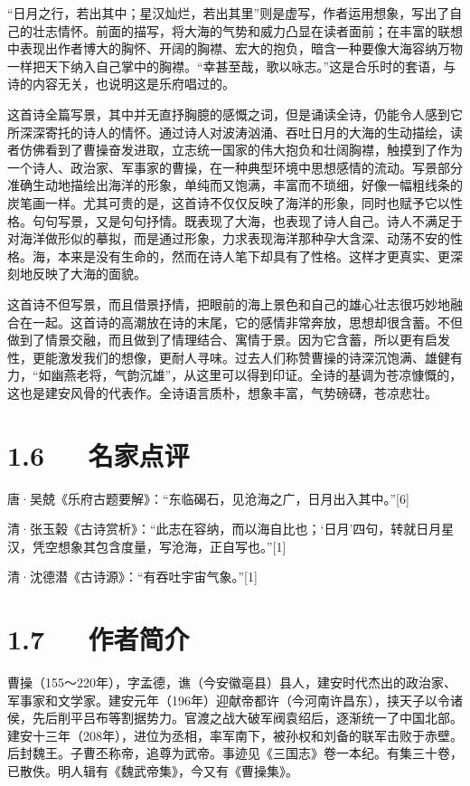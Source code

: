\documentclass[letterpaper,12pt,english]{sphinxmanual}
\begin{document}
“日月之行，若出其中；星汉灿烂，若出其里”则是虚写，作者运用想象，写出了自己的壮志情怀。前面的描写，将大海的气势和威力凸显在读者面前；在丰富的联想中表现出作者博大的胸怀、开阔的胸襟、宏大的抱负，暗含一种要像大海容纳万物一样把天下纳入自己掌中的胸襟。“幸甚至哉，歌以咏志。”这是合乐时的套语，与诗的内容无关，也说明这是乐府唱过的。

这首诗全篇写景，其中并无直抒胸臆的感慨之词，但是诵读全诗，仍能令人感到它所深深寄托的诗人的情怀。通过诗人对波涛汹涌、吞吐日月的大海的生动描绘，读者仿佛看到了曹操奋发进取，立志统一国家的伟大抱负和壮阔胸襟，触摸到了作为一个诗人、政治家、军事家的曹操，在一种典型环境中思想感情的流动。写景部分准确生动地描绘出海洋的形象，单纯而又饱满，丰富而不琐细，好像一幅粗线条的炭笔画一样。尤其可贵的是，这首诗不仅仅反映了海洋的形象，同时也赋予它以性格。句句写景，又是句句抒情。既表现了大海，也表现了诗人自己。诗人不满足于对海洋做形似的摹拟，而是通过形象，力求表现海洋那种孕大含深、动荡不安的性格。海，本来是没有生命的，然而在诗人笔下却具有了性格。这样才更真实、更深刻地反映了大海的面貌。

这首诗不但写景，而且借景抒情，把眼前的海上景色和自己的雄心壮志很巧妙地融合在一起。这首诗的高潮放在诗的末尾，它的感情非常奔放，思想却很含蓄。不但做到了情景交融，而且做到了情理结合、寓情于景。因为它含蓄，所以更有启发性，更能激发我们的想像，更耐人寻味。过去人们称赞曹操的诗深沉饱满、雄健有力，“如幽燕老将，气韵沉雄”，从这里可以得到印证。全诗的基调为苍凉慷慨的，这也是建安风骨的代表作。全诗语言质朴，想象丰富，气势磅礴，苍凉悲壮。


\section{1.6   名家点评}
\label{\detokenize{p01_u6563_u6587/_u66f9_u64cd-_u89c2_u6ca7_u6d77:id8}}
唐·吴兢《乐府古题要解》：“东临碣石，见沧海之广，日月出入其中。”{[}6{]}

清·张玉榖《古诗赏析》：“此志在容纳，而以海自比也；‘日月’四句，转就日月星汉，凭空想象其包含度量，写沧海，正自写也。”{[}1{]}

清·沈德潜《古诗源》：“有吞吐宇宙气象。”{[}1{]}


\section{1.7   作者简介}
\label{\detokenize{p01_u6563_u6587/_u66f9_u64cd-_u89c2_u6ca7_u6d77:id9}}
曹操（155～220年），字孟德，谯（今安徽亳县）县人，建安时代杰出的政治家、军事家和文学家。建安元年（196年）迎献帝都许（今河南许昌东），挟天子以令诸侯，先后削平吕布等割据势力。官渡之战大破军阀袁绍后，逐渐统一了中国北部。建安十三年（208年），进位为丞相，率军南下，被孙权和刘备的联军击败于赤壁。后封魏王。子曹丕称帝，追尊为武帝。事迹见《三国志》卷一本纪。有集三十卷，已散佚。明人辑有《魏武帝集》，今又有《曹操集》。
\end{document}
